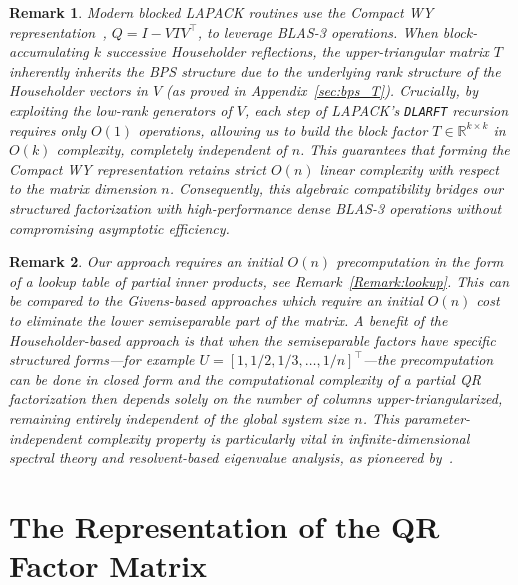 \documentclass[a4paper,fleqn]{cas-sc}
\newtheorem{remark}{Remark}[section]
\begin{document}
\begin{remark}
Modern blocked LAPACK routines use the Compact WY representation~\citep{schreiber1987storage}, $Q = I - V T V^\top$, to leverage BLAS-3 operations. When block-accumulating $k$ successive Householder reflections, the upper-triangular matrix $T$ inherently inherits the BPS structure due to the underlying rank structure of the Householder vectors in $V$ (as proved in Appendix~\ref{sec:bps_T}). Crucially, by exploiting the low-rank generators of $V$, each step of LAPACK's \texttt{DLARFT} recursion requires only $O(1)$ operations, allowing us to build the block factor $T \in \mathbb{R}^{k \times k}$ in $O(k)$ complexity, completely independent of $n$. This guarantees that forming the Compact WY representation retains strict $O(n)$ linear complexity with respect to the matrix dimension $n$. Consequently, this algebraic compatibility bridges our structured factorization with high-performance dense BLAS-3 operations without compromising asymptotic efficiency.
\end{remark} 

\begin{remark}
Our approach requires an initial $O(n)$ precomputation in the form of a lookup table of partial inner products, see Remark~\ref{Remark:lookup}. 
This can be compared to the Givens-based approaches which require an initial $O(n)$ cost to eliminate the lower semiseparable part of the matrix. A benefit of the Householder-based approach is that when the semiseparable factors have specific structured forms---for example $U = [1, 1/2, 1/3, \dots, 1/n]^\top$---the precomputation can be done in closed form and the computational complexity of a partial QR factorization then depends solely on the number of columns upper-triangularized, remaining entirely independent of the global system size $n$. This parameter-independent complexity property is particularly vital in  infinite-dimensional spectral theory and resolvent-based eigenvalue analysis, as pioneered by~\cite{colbrook2021computing}. 
\end{remark}

\section{The Representation of the QR Factor Matrix}
\label{sec:factors}
\end{document}
